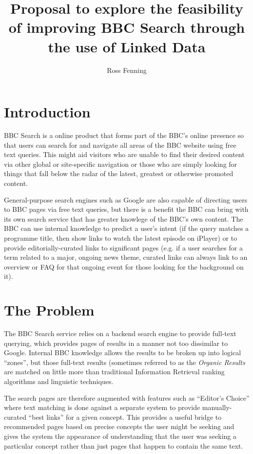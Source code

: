 \documentclass[10pt,a4paper]{article}
\title{Proposal to explore the feasibility of improving BBC Search through the use of Linked Data}
\author{Ross Fenning}
\begin{document}
\maketitle
\thispagestyle{empty}

\section{Introduction}

BBC Search is a online product that forms part of the BBC's online presence so
that users can search for and navigate all areas of the BBC website using
free text queries. This might aid visitors who are unable to find their desired
content via other global or site-specific navigation or those who are simply
looking for things that fall below the radar of the latest, greatest or
otherwise promoted content.

General-purpose search engines such as Google are also capable of directing
users to BBC pages via free text queries, but there is a benefit the BBC
can bring with its own search service that has greater knowlege of the
BBC's own content. The BBC can use internal knowledge to predict a user's
intent (if the query matches a programme title, then show links to watch
the latest episode on iPlayer) or to provide editorially-curated
links to significant pages (e.g. if a user searches for a term
related to a major, ongoing news theme, curated links can always
link to an overview or FAQ for that ongoing event for those
looking for the background on it).

\section{The Problem}

The BBC Search service relies on a backend search engine to provide
full-text querying, which provides pages of results in a manner not
too dissimilar to Google. Internal BBC knowledge allows the results
to be broken up into logical ``zones'', but those full-text results
(sometimes referred to as the \emph{Organic Results} are matched
on little more than traditional Information Retrieval ranking
algorithms and linguistic techniques.

The search pages are therefore augmented with features such as
``Editor's Choice'' where text matching is done against a separate
system to provide manually-curated ``best links'' for a given
concept. This provides a useful bridge to recommended pages based
on precise concepts the user might be seeking and gives the system
the appearance of understanding that the user was seeking a
particular concept rather than just pages that happen to contain
the same text.
\end{document}
